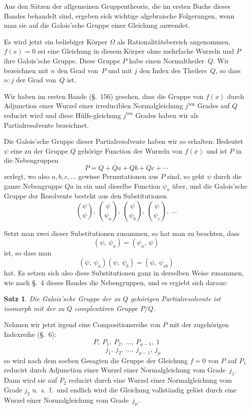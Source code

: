 \documentclass[12pt,a4paper]{article}
\newtheorem*{satz}{Satz}
\begin{document}
Aus den S\"atzen der allgemeinen Gruppentheorie, die im ersten Buche dieses Bandes behandelt sind, ergeben sich wichtige algebraische Folgerungen, wenn man sie auf die Galois'sche Gruppe einer Gleichung anwendet.

Es wird jetzt ein beliebiger K\"orper $\Omega$ als Rationalit\"atsbereich angenommen, $f(x)=0$ sei eine Gleichung in diesem K\"orper ohne mehrfache Wurzeln und $P$ ihre Galois'sche Gruppe. Diese Gruppe $P$ habe einen Normaltheiler~$Q$. Wir bezeichnen mit $n$ den Grad von~$P$ und mit $j$ den Index des Theilers~$Q$, so dass $n:j$ der Grad von~$Q$ ist.

Wir haben im ersten Bande (\S.~156) gesehen, dass die Gruppe von $f(x)$ durch Adjunction einer Wurzel einer irreduciblen Normalgleichung $j^{\text{ten}}$ Grades auf $Q$ reducirt wird und diese H\"ulfs-gleichung $j^{\text{ten}}$ Grades haben wir als Partialresolvente bezeichnet.

Die Galois'sche Gruppe dieser Partialresolvente haben wir so erhalten: Bedeutet $\psi$ eine zu der Gruppe $Q$ geh\"orige Function der Wurzeln von $f(x)$ und ist $P$ in die Nebengruppen
\[
P = Q + Qa + Qb + Qc + \cdots
\]
zerlegt, wo also $a,b,c,\ldots$ gewisse Permutationen aus $P$ sind, so geht $\psi$ durch die ganze Nebengruppe $Qa$ in ein und dieselbe Function $\psi_a$ \"uber, und die Galois'sche Gruppe der Resolvente besteht aus den Substitutionen
\[
\binom{\psi}{\psi},\ \binom{\psi}{\psi_a},\ \binom{\psi}{\psi_b},\ \binom{\psi}{\psi_c},\ \ldots
\]

Setzt man zwei dieser Substitutionen zusammen, so hat man zu beachten, dass
\[
(\psi,\ \psi_a) = (\psi_a,\ \psi)
\]
ist, so dass man
\[
(\psi,\ \psi_a)(\psi,\ \psi_b) = (\psi,\ \psi_{ab})
\]
hat. Es setzen sich also diese Substitutionen ganz in derselben Weise zusammen, wie nach \S.~4 dieses Bandes die Nebengruppen, und es ergiebt sich daraus:

\begin{satz}
Die Galois'sche Gruppe der zu $Q$ geh\"origen Partialresolvente ist isomorph mit der zu $Q$ complent\"aren Gruppe $P/Q$.
\end{satz}

Nehmen wir jetzt irgend eine Compositionsreihe von $P$ mit der zugeh\"origen Indexreihe (\S.~6):
\begin{equation}
\tag{1}
P,\ P_1,\ P_2,\ \ldots,\ P_{\mu-1},\ 1
\end{equation}
\[
\qquad j_1,\ j_2,\ \ldots,\ j_{\mu-1},\ j_{\mu}
\]
so wird nach dem soeben Gesagten die Gruppe der Gleichung $f=0$ von $P$ auf $P_1$ reducirt durch Adjunction einer Wurzel einer Normalgleichung vom Grade~$j_1$. Dann wird sie auf $P_2$ reducirt durch eine Wurzel einer Normalgleichung vom Grade $j_2$ u.~s.~f.\ und endlich wird die Gleichung vollst\"andig gel\"ost durch eine Wurzel einer Normalgleichung vom Grade~$j_{\mu}$.
\end{document}
